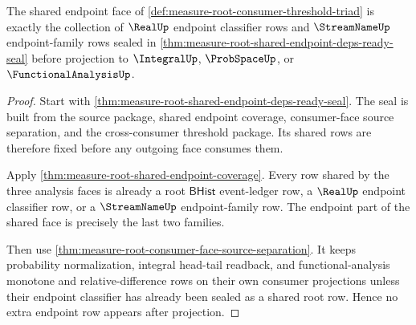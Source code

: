 \begin{theorem}
\label{thm:measure-root-shared-endpoint-threshold-triad-face}
The shared endpoint face of
\autoref{def:measure-root-consumer-threshold-triad} is exactly the collection
of $\RealUp$ endpoint classifier rows and $\StreamNameUp$ endpoint-family rows
sealed in
\autoref{thm:measure-root-shared-endpoint-deps-ready-seal} before projection
to $\IntegralUp$, $\ProbSpaceUp$, or $\FunctionalAnalysisUp$.
\end{theorem}
\begin{proof}
Start with \autoref{thm:measure-root-shared-endpoint-deps-ready-seal}. The
seal is built from the source package, shared endpoint coverage, consumer-face
source separation, and the cross-consumer threshold package. Its shared rows
are therefore fixed before any outgoing face consumes them.

Apply \autoref{thm:measure-root-shared-endpoint-coverage}. Every row shared
by the three analysis faces is already a root $\mathsf{BHist}$ event-ledger
row, a $\RealUp$ endpoint classifier row, or a $\StreamNameUp$
endpoint-family row. The endpoint part of the shared face is precisely the
last two families.

Then use \autoref{thm:measure-root-consumer-face-source-separation}. It keeps
probability normalization, integral head-tail readback, and
functional-analysis monotone and relative-difference rows on their own
consumer projections unless their endpoint classifier has already been sealed
as a shared root row. Hence no extra endpoint row appears after projection.
\end{proof}

